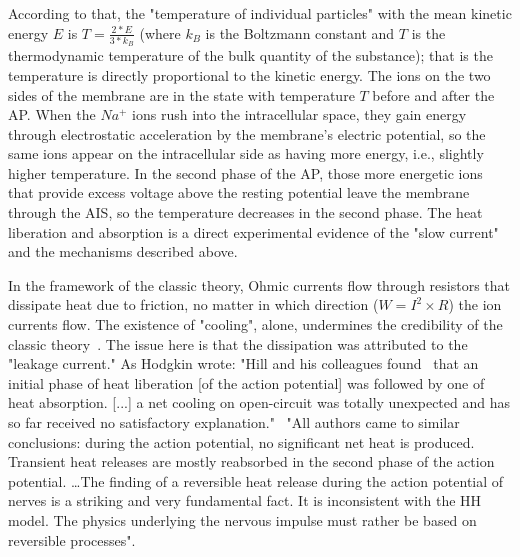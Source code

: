 According to that, the "temperature of individual particles" with the mean kinetic energy $E$ is $T=\frac{2*E}{3*k_B}$ (where $k_B$ is the Boltzmann constant and $T$ is the thermodynamic temperature of the
bulk quantity of the substance); that is the temperature is directly proportional to the kinetic energy. The ions on the two sides of the membrane are in the state with temperature $T$ before and after the
AP. When the $Na^+$ ions rush into the intracellular space, they gain energy through electrostatic acceleration by the membrane's electric potential, so the same ions appear on the intracellular side as having more energy, i.e., slightly higher temperature. In the second phase of the 
AP, those more energetic ions that provide excess voltage above the resting potential leave the membrane through the 
AIS,
 so the temperature decreases in the second phase. 
The heat liberation and absorption is a direct experimental evidence of the "slow current" and the mechanisms described above.


In the framework of the classic
theory, Ohmic currents ﬂow through resistors that dissipate heat due to
friction, no matter in which direction ($W=I^2\times R$) the ion currents ﬂow.
The existence of "cooling", alone, undermines the credibility of the classic theory~\cite{HEIMBURGReversibleHeatProduction:2021}.
The issue here is that the dissipation was attributed to the "leakage current."
As Hodgkin wrote: "Hill and his colleagues found~\cite{HeatProductionNeuron:1958} that an initial phase of heat liberation [of the action potential] was followed by one of
heat absorption. [...] a net cooling on open-circuit was totally unexpected
and has so far received no satisfactory explanation."~\cite{HodgkinConduction:1964}
"All authors came to similar conclusions: during
the action potential, no signiﬁcant net heat is produced. Transient heat releases are mostly reabsorbed in the second phase of the action potential. \dots The ﬁnding of a reversible heat release during the action potential of
nerves is a striking and very fundamental fact. It is inconsistent with the
\gls{HH} model. The physics underlying the nervous impulse
must rather be based on reversible processes".~\cite{ThermalBiophysics:2007}

